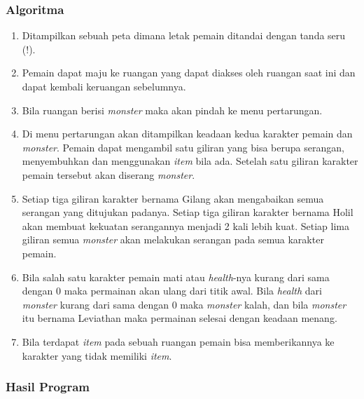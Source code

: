 \documentclass[../main.tex]{subfiles}
\begin{document}
    \subsubsection{Algoritma}
    {\renewcommand{\labelenumi}{\alph{enumi}.}
        \begin{enumerate}[leftmargin=1.56cm]
            \item {Ditampilkan sebuah peta dimana letak pemain ditandai dengan tanda seru (!).}
            \item {Pemain dapat maju ke ruangan yang dapat diakses oleh ruangan saat ini dan dapat kembali keruangan sebelumnya.}
            \item {Bila ruangan berisi \textit{monster} maka akan pindah ke menu pertarungan.}
            \item {Di menu pertarungan akan ditampilkan keadaan kedua karakter pemain dan \textit{monster}. Pemain dapat mengambil satu giliran yang bisa berupa serangan, menyembuhkan dan menggunakan \textit{item} bila ada. Setelah satu giliran karakter pemain tersebut akan diserang \textit{monster}.}
            \item {Setiap tiga giliran karakter bernama Gilang akan mengabaikan semua serangan yang ditujukan padanya. Setiap tiga giliran karakter bernama Holil akan membuat kekuatan serangannya menjadi 2 kali lebih kuat. Setiap lima giliran semua \textit{monster} akan melakukan serangan pada semua karakter pemain.}
            \item {Bila salah satu karakter pemain mati atau \textit{health}-nya kurang dari sama dengan 0 maka permainan akan ulang dari titik awal. Bila \textit{health} dari \textit{monster} kurang dari sama dengan 0 maka \textit{monster} kalah, dan bila \textit{monster} itu bernama Leviathan maka permainan selesai dengan keadaan menang.}
            \item {Bila terdapat \textit{item} pada sebuah ruangan pemain bisa memberikannya ke karakter yang tidak memiliki \textit{item}.}
        \end{enumerate}
    }
    \subsubsection{\Flowchart}
    \subsubsection{\SourceCode}
    \subsubsection{Hasil Program}
\end{document}
